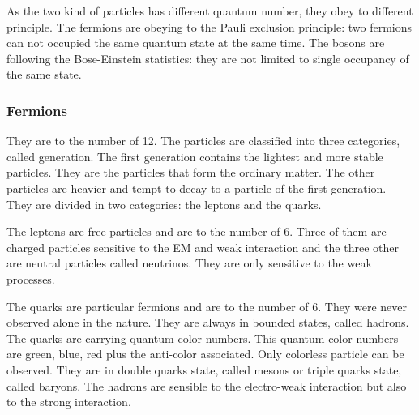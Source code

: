     As the two kind of particles has different quantum number, they obey to different principle.
    The fermions are obeying to the Pauli exclusion principle: two fermions can not occupied the same quantum state at the same time.
    The bosons are following the Bose-Einstein statistics: they are not limited to single occupancy of the same state.
    
    \subsubsection{Fermions}
    
    They are to the number of 12. 
    The particles are classified into three categories, called generation. 
    The first generation contains the lightest and more stable particles.
    They are the particles that form the ordinary matter.
    The other particles are heavier and tempt to decay to a particle of the first generation.
    They are divided in two categories: the leptons and the quarks.
    
    The leptons are free particles and are to the number of 6.
    Three of them are charged particles sensitive to the EM and weak interaction and the three other are neutral particles called neutrinos. They are only sensitive to the weak processes.

    The quarks are particular fermions and are to the number of 6. 
    They were never observed alone in the nature. 
    They are always in bounded states, called hadrons. 
    The quarks are carrying quantum color numbers. 
    This quantum color numbers are green, blue, red plus the anti-color associated.
    Only colorless particle can be observed. 
    They are in double quarks state, called mesons or triple quarks state, called baryons. 
    The hadrons are sensible to the electro-weak interaction but also to the strong interaction.
    
